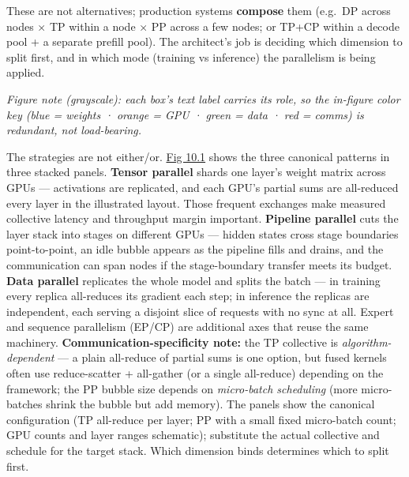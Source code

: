 These are not alternatives; production systems \textbf{compose} them
(e.g.~DP across nodes × TP within a node × PP across a few nodes; or
TP+CP within a decode pool + a separate prefill pool). The architect's
job is deciding which dimension to split first, and in which mode
(training vs inference) the parallelism is being applied.

\emph{Figure note (grayscale): each box's text label carries its role,
so the in-figure color key (blue = weights · orange = GPU · green = data
· red = comms) is redundant, not load-bearing.}

The strategies are not either/or. \hyperref[fig:10.1]{Fig 10.1} shows the three canonical
patterns in three stacked panels. \textbf{Tensor parallel} shards one
layer's weight matrix across GPUs --- activations are replicated, and
each GPU's partial sums are all-reduced every layer in the illustrated
layout. Those frequent exchanges make measured collective latency and
throughput margin important. \textbf{Pipeline parallel} cuts the layer
stack into stages on different GPUs --- hidden states cross stage
boundaries point-to-point, an idle bubble appears as the pipeline fills
and drains, and the communication can span nodes if the stage-boundary
transfer meets its budget. \textbf{Data parallel} replicates the whole
model and splits the batch --- in training every replica all-reduces its
gradient each step; in inference the replicas are independent, each
serving a disjoint slice of requests with no sync at all. Expert and
sequence parallelism (EP/CP) are additional axes that reuse the same
machinery. \textbf{Communication-specificity note:} the TP collective is
\emph{algorithm-dependent} --- a plain all-reduce of partial sums is one
option, but fused kernels often use reduce-scatter + all-gather (or a
single all-reduce) depending on the framework; the PP bubble size
depends on \emph{micro-batch scheduling} (more micro-batches shrink the
bubble but add memory). The panels show the canonical configuration (TP
all-reduce per layer; PP with a small fixed micro-batch count; GPU
counts and layer ranges schematic); substitute the actual collective and
schedule for the target stack. Which dimension binds determines which to
split first.

